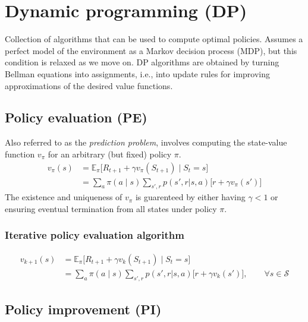\section{Dynamic programming (DP)}

Collection of algorithms that can be used to compute optimal policies.
Assumes a perfect model of the environment as a Markov decision process (MDP), but this condition is relaxed as we move on.
DP algorithms are obtained by turning Bellman equations into assignments, i.e., into update rules for improving approximations of the desired value functions.

\subsection{Policy evaluation (PE)}

Also referred to as the \textit{prediction problem}, involves computing the state-value function \( v_\pi \) for an arbitrary (but fixed) policy \( \pi \).
\begin{equation}
    \begin{aligned}
        v_\pi(s)
         & =
        \mathbb{E}_{\pi} \big[ R_{t+1} + \gamma v_\pi(S_{t+1}) \;\big|\; S_t = s \big]
        \\ & =
        \sum_{a} \pi(a \mid s) \sum_{s', r} p(s', r | s, a) \Big[ r + \gamma v_\pi(s') \Big]
    \end{aligned}
\end{equation}
The existence and uniqueness of \( v_\pi \) is guarenteed by either having \( \gamma < 1 \) or ensuring eventual termination from all states under policy \( \pi \).

\subsubsection{Iterative policy evaluation algorithm}\label{sec:iterative-policy-evaluation}

\begin{equation}
    \begin{aligned}
        v_{k+1}(s)
         & =
        \mathbb{E}_{\pi} \big[ R_{t+1} + \gamma v_k(S_{t+1}) \;\big|\; S_t = s \big]
        \\ & =
        \sum_{a} \pi(a \mid s) \sum_{s', r} p(s', r | s, a) \Big[ r + \gamma v_k(s') \Big]
        , \qquad \forall s \in \mathcal{S}
    \end{aligned}
\end{equation}

\subsection{Policy improvement (PI)}

